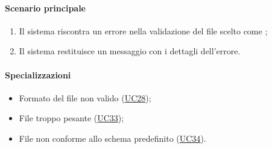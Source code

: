\paragraph*{Scenario principale}
\begin{enumerate}
  \item Il sistema riscontra un errore nella validazione del file scelto come ;
  \item Il sistema restituisce un messaggio con i dettagli dell'errore. 
\end{enumerate}

\paragraph*{Specializzazioni}
\begin{itemize}
  \item Formato del file non valido (\hyperref[UC28]{UC28});
  \item File troppo pesante (\hyperref[UC33]{UC33});
  \item File non conforme allo schema predefinito (\hyperref[UC34]{UC34}).
\end{itemize}